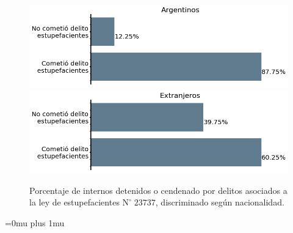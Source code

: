 \documentclass[10pt]{article}
\begin{document}
\begin{figure}[H]
	\centering
\includegraphics[scale=0.28]{graficos/estupefacientes_bar_argentinos.png}
\includegraphics[scale=0.28]{graficos/estupefacientes_bar_extranjeros.png}
	\caption{Porcentaje de internos detenidos o cendenado por delitos asociados a la ley de estupefacientes $\mathrm{N}^{\circ}\; 23737$, discriminado seg\'un nacionalidad.\label{estupefacientes_discriminado}}
\end{figure}

\Urlmuskip=0mu plus 1mu\relax


\end{document}
